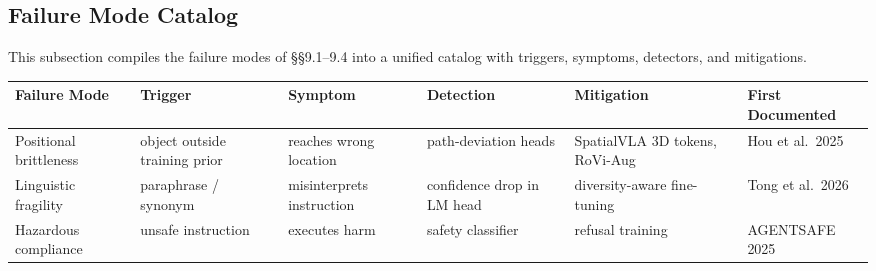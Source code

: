 \subsection{Failure Mode Catalog}\label{failure-mode-catalog}

This subsection compiles the failure modes of §§9.1--9.4 into a unified catalog with triggers, symptoms, detectors, and mitigations.

{\def\LTcaptype{none} %
\begin{longtable}[]{@{}
  >{\raggedright\arraybackslash}p{}
  >{\raggedright\arraybackslash}p{}
  >{\raggedright\arraybackslash}p{}
  >{\raggedright\arraybackslash}p{}
  >{\raggedright\arraybackslash}p{}
  >{\raggedright\arraybackslash}p{}@{}}
\toprule\noalign{}
\begin{minipage}[b]{\linewidth}\raggedright
Failure Mode
\end{minipage} & \begin{minipage}[b]{\linewidth}\raggedright
Trigger
\end{minipage} & \begin{minipage}[b]{\linewidth}\raggedright
Symptom
\end{minipage} & \begin{minipage}[b]{\linewidth}\raggedright
Detection
\end{minipage} & \begin{minipage}[b]{\linewidth}\raggedright
Mitigation
\end{minipage} & \begin{minipage}[b]{\linewidth}\raggedright
First Documented
\end{minipage} \\
\midrule\noalign{}
\endhead
\bottomrule\noalign{}
\endlastfoot
Positional brittleness & object outside training prior & reaches wrong location & path-deviation heads & SpatialVLA 3D tokens, RoVi-Aug & Hou et al.~2025 \\
Linguistic fragility & paraphrase / synonym & misinterprets instruction & confidence drop in LM head & diversity-aware fine-tuning & Tong et al.~2026 \\
Hazardous compliance & unsafe instruction & executes harm & safety classifier & refusal training & AGENTSAFE 2025 \\

\end{longtable}}
